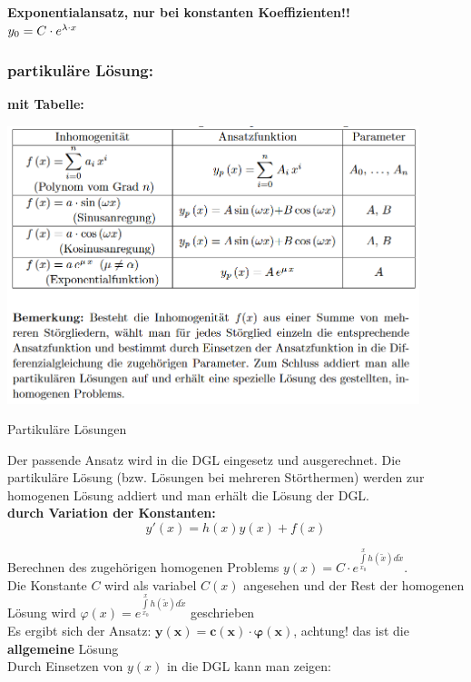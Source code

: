 \textbf{Exponentialansatz, nur bei konstanten Koeffizienten!!}\\
$y_0=C\cdot e^{\lambda \cdot x}$

\subsubsection{partikuläre Lösung:}

\textbf{mit Tabelle:}
\begin{center}
    \captionsetup{type=figure}
    \includegraphics[width=0.9\textwidth]{pictures/Partikuläre_Lösungen_Skript.png}
    \caption{Partikuläre Lösungen}\label{fig:partikuläre_lsg}
\end{center}

Der passende Ansatz wird in die DGL eingesetz und ausgerechnet. Die partikuläre Lösung (bzw. Lösungen bei mehreren Störthermen) werden zur homogenen Lösung addiert und man erhält die Lösung der DGL.\\

\textbf{durch Variation der Konstanten:}
 \[y'(x)=h(x)y(x) + f(x)\]


Berechnen des zugehörigen homogenen Problems $y(x)=C \cdot e ^{\int\limits_{x_0}^{x}h(\tilde{x})d \tilde{x}}$.\\
Die Konstante $C$ wird als variabel $C(x)$ angesehen und der Rest der homogenen Lösung wird $\varphi (x)=e ^{\int\limits_{x_0}^{x}h(\tilde{x})d \tilde{x}}$ geschrieben\\

Es ergibt sich der Ansatz: $\bm{ y(x)=c(x)\cdot \varphi(x)}$, achtung! das ist die \textbf{allgemeine} Lösung\\

Durch Einsetzen von $y(x)$ in die DGL kann man zeigen:

